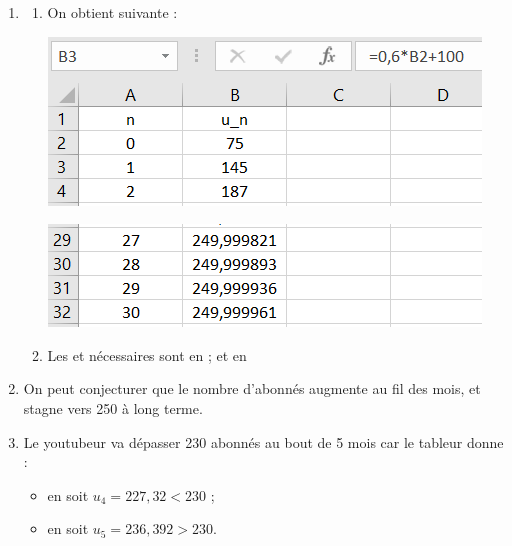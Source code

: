 \documentclass[a4paper,11pt]{article}
\begin{document}
\begin{cmanip}
\vspace{-0.45cm}
\begin{enumerate}
	\item 
	\begin{enumerate}
		\item On obtient  suivante :
		\begin{center}
			\includegraphics[scale=0.45]{td02_excel_a}
			
			\includegraphics[scale=0.45]{td02_excel_b}
		\end{center}
		\item Les  et  nécessaires sont  en  ; et  en 
	\end{enumerate}
	\item On peut conjecturer que le nombre d'abonnés augmente au fil des mois, et stagne vers 250 à long terme.
	\item Le youtubeur va dépasser 230 abonnés au bout de 5 mois car le tableur donne :
	\begin{itemize}
		\item {} en  soit $u_4 = 227,32 < 230$ ;
		\item {} en  soit $u_5 = 236,392 > 230$.
	\end{itemize}
\end{enumerate}
\end{cmanip}
\end{document}
